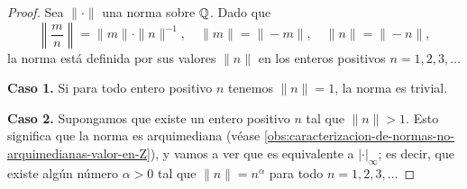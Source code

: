 \documentclass{article}
\numberwithin{equation}{section}
\theoremstyle{definition}
\begin{document}
\begin{proof}
  Sea $\|\cdot\|$ una norma sobre $\mathbb{Q}$. Dado que
  \[ \left\|\frac{m}{n}\right\| = \|m\|\cdot \|n\|^{-1}, \quad
     \|m\| = \|-m\|, \quad
     \|n\| = \|-n\|, \]
  la norma está definida por sus valores $\|n\|$ en los enteros positivos
  $n = 1, 2, 3, \ldots$

  \vspace{1em}

  \noindent\textbf{Caso 1.} Si para todo entero positivo $n$ tenemos
  $\|n\| = 1$, la norma es trivial.

  \vspace{1em}

  \noindent\textbf{Caso 2.} Supongamos que existe un entero positivo $n$ tal que
  $\|n\| > 1$. Esto significa que la norma es arquimediana (véase
  \ref{obs:caracterizacion-de-normas-no-arquimedianas-valor-en-Z}), y vamos a
  ver que es equivalente a $|\cdot|_\infty$; es decir, que existe algún número
  $\alpha > 0$ tal que $\|n\| = n^\alpha$ para todo $n = 1,2,3,\ldots$


\end{proof}
\end{document}
